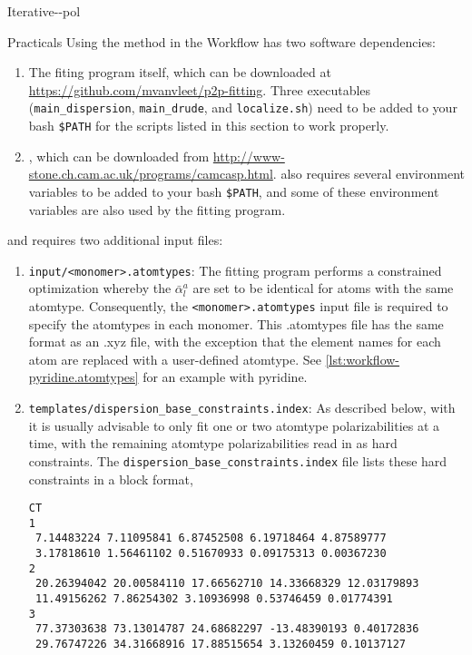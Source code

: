 \begin{subsubsection}{Iterative-\dma-pol}
\begin{paragraph}{Practicals}
Using the \idma method in the Workflow has two software dependencies: 
\begin{enumerate}
\item The \idma fiting program itself, which can be downloaded at
\url{https://github.com/mvanvleet/p2p-fitting}. Three executables
(\verb|main_dispersion|, \verb|main_drude|, and \verb|localize.sh|) need to be added to your bash
\verb|$PATH| for the scripts listed in this section to work properly.
%
\item \camcasp, which can be downloaded from 
\url{http://www-stone.ch.cam.ac.uk/programs/camcasp.html}. \camcasp also
requires several environment variables to be added to your bash \verb|$PATH|, and some of these
environment variables are also used by the \idma fitting program.
%
\end{enumerate}
and requires two additional input files:
\begin{enumerate}
\item \verb|input/<monomer>.atomtypes|: The \idma fitting program performs
a constrained optimization whereby the $\bar{\alpha}^a_l$ are set to be
identical for atoms with the same atomtype. Consequently, the
\verb|<monomer>.atomtypes| input file is required to specify the atomtypes in
each monomer. This .atomtypes file has the same
format as an .xyz file, with the exception that the element names for each atom
are replaced with a user-defined atomtype. See
\cref{lst:workflow-pyridine.atomtypes} for an example with pyridine.
%
\item \verb|templates/dispersion_base_constraints.index|: As described below,
with \idma it is usually advisable to only fit one or two atomtype polarizabilities at a
time, with the remaining atomtype polarizabilities read in as hard
constraints. The \verb|dispersion_base_constraints.index| file lists these
hard constraints in a block format, 

\begin{minipage}{\linewidth}
\begin{lstlisting}
CT
1 
 7.14483224 7.11095841 6.87452508 6.19718464 4.87589777 
 3.17818610 1.56461102 0.51670933 0.09175313 0.00367230 
2 
 20.26394042 20.00584110 17.66562710 14.33668329 12.03179893 
 11.49156262 7.86254302 3.10936998 0.53746459 0.01774391 
3 
 77.37303638 73.13014787 24.68682297 -13.48390193 0.40172836 
 29.76747226 34.31668916 17.88515654 3.13260459 0.10137127


\end{lstlisting}
\end{minipage}
\end{enumerate}
\end{paragraph}
\end{subsubsection}
